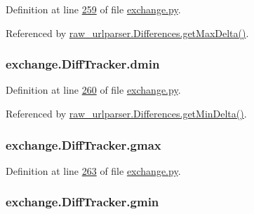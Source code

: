 Definition at line \hyperlink{exchange_8py_source_l00259}{259} of file \hyperlink{exchange_8py_source}{exchange.\+py}.



Referenced by \hyperlink{raw__urlparser_8py_source_l00097}{raw\+\_\+urlparser.\+Differences.\+get\+Max\+Delta()}.

\subsubsection[{\texorpdfstring{dmin}{dmin}}]{\setlength{\rightskip}{0pt plus 5cm}exchange.\+Diff\+Tracker.\+dmin}\hypertarget{classexchange_1_1_diff_tracker_a0a1bbdbeeee705d2448d69e98f77a14c}{}\label{classexchange_1_1_diff_tracker_a0a1bbdbeeee705d2448d69e98f77a14c}


Definition at line \hyperlink{exchange_8py_source_l00260}{260} of file \hyperlink{exchange_8py_source}{exchange.\+py}.



Referenced by \hyperlink{raw__urlparser_8py_source_l00094}{raw\+\_\+urlparser.\+Differences.\+get\+Min\+Delta()}.

\subsubsection[{\texorpdfstring{gmax}{gmax}}]{\setlength{\rightskip}{0pt plus 5cm}exchange.\+Diff\+Tracker.\+gmax}\hypertarget{classexchange_1_1_diff_tracker_a73f20240fb1d81a320a6f78aec022529}{}\label{classexchange_1_1_diff_tracker_a73f20240fb1d81a320a6f78aec022529}


Definition at line \hyperlink{exchange_8py_source_l00263}{263} of file \hyperlink{exchange_8py_source}{exchange.\+py}.

\subsubsection[{\texorpdfstring{gmin}{gmin}}]{\setlength{\rightskip}{0pt plus 5cm}exchange.\+Diff\+Tracker.\+gmin}\hypertarget{classexchange_1_1_diff_tracker_a8c2277408ff52d5bb8913a98f4efe8b0}{}\label{classexchange_1_1_diff_tracker_a8c2277408ff52d5bb8913a98f4efe8b0}


